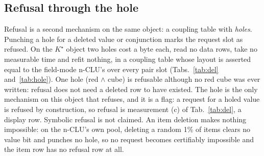 \documentclass{article} %
\newcommand{\Kstar}{\ensuremath{K^{\star}}}
\begin{document}
\subsection{Refusal through the hole}
\label{sec:hole}

Refusal is a second mechanism on the same object: a coupling table with \emph{holes}.
Punching a hole for a deleted value or conjunction marks the request slot as refused. On the
$\Kstar$ object two holes cost a byte each, read no data rows, take no measurable time and refit nothing, in
a coupling table whose layout is asserted equal to the field-mode n-CLU's over every pair
slot (Tabs.~\ref{tab:del} and~\ref{tab:hole}). %
One hole (red $\wedge$ cube) is refusable although no red cube was ever written: refusal does
not need a deleted row to have existed. %
The hole is the only mechanism on this object that refuses, and it is a flag: a request for a
holed value is refused by construction, so refusal is measurement (c) of Tab.~\ref{tab:del}, a
display row. Symbolic refusal is not claimed. An item deletion makes nothing impossible: on the n-CLU's own pool, deleting a random
1\% of items clears no value bit and punches no hole, so no request becomes certifiably impossible
and the item row has no refusal row at all. %
\end{document}
